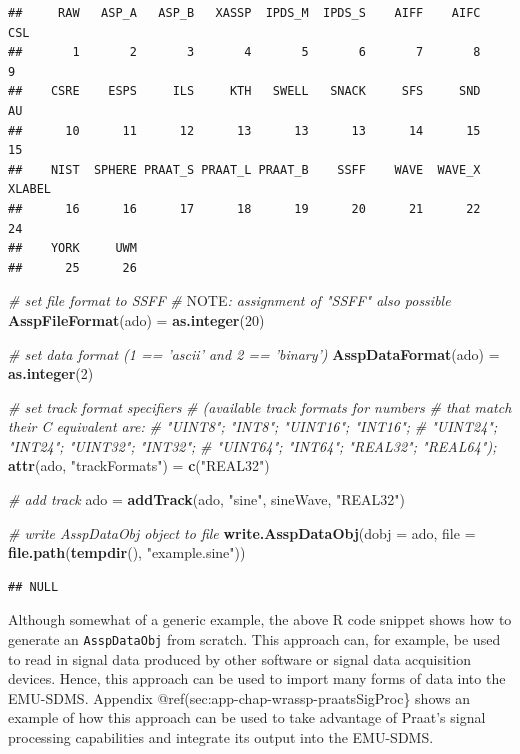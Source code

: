 \documentclass[]{book}
\newenvironment{Shaded}{\begin{snugshade}}{\end{snugshade}}
\newcommand{\AlertTok}[1]{\textcolor[rgb]{0.94,0.16,0.16}{#1}}
\newcommand{\CommentTok}[1]{\textcolor[rgb]{0.56,0.35,0.01}{\textit{#1}}}
\newcommand{\DataTypeTok}[1]{\textcolor[rgb]{0.13,0.29,0.53}{#1}}
\newcommand{\DecValTok}[1]{\textcolor[rgb]{0.00,0.00,0.81}{#1}}
\newcommand{\KeywordTok}[1]{\textcolor[rgb]{0.13,0.29,0.53}{\textbf{#1}}}
\newcommand{\NormalTok}[1]{#1}
\newcommand{\StringTok}[1]{\textcolor[rgb]{0.31,0.60,0.02}{#1}}
\theoremstyle{definition}
\theoremstyle{definition}
\theoremstyle{definition}
\theoremstyle{remark}
\begin{document}
\begin{verbatim}
##     RAW   ASP_A   ASP_B   XASSP  IPDS_M  IPDS_S    AIFF    AIFC     CSL 
##       1       2       3       4       5       6       7       8       9 
##    CSRE    ESPS     ILS     KTH   SWELL   SNACK     SFS     SND      AU 
##      10      11      12      13      13      13      14      15      15 
##    NIST  SPHERE PRAAT_S PRAAT_L PRAAT_B    SSFF    WAVE  WAVE_X  XLABEL 
##      16      16      17      18      19      20      21      22      24 
##    YORK     UWM 
##      25      26
\end{verbatim}

\begin{Shaded}
\begin{Highlighting}[]
\CommentTok{# set file format to SSFF}
\CommentTok{# }\AlertTok{NOTE}\CommentTok{: assignment of "SSFF" also possible}
\KeywordTok{AsspFileFormat}\NormalTok{(ado) =}\StringTok{ }\KeywordTok{as.integer}\NormalTok{(}\DecValTok{20}\NormalTok{)}

\CommentTok{# set data format (1 == 'ascii' and 2 == 'binary')}
\KeywordTok{AsspDataFormat}\NormalTok{(ado) =}\StringTok{ }\KeywordTok{as.integer}\NormalTok{(}\DecValTok{2}\NormalTok{)}

\CommentTok{# set track format specifiers}
\CommentTok{# (available track formats for numbers}
\CommentTok{# that match their C equivalent are:}
\CommentTok{# "UINT8"; "INT8"; "UINT16"; "INT16";}
\CommentTok{# "UINT24"; "INT24"; "UINT32"; "INT32";}
\CommentTok{# "UINT64"; "INT64"; "REAL32"; "REAL64");}
\KeywordTok{attr}\NormalTok{(ado, }\StringTok{"trackFormats"}\NormalTok{) =}\StringTok{ }\KeywordTok{c}\NormalTok{(}\StringTok{"REAL32"}\NormalTok{)}

\CommentTok{# add track}
\NormalTok{ado =}\StringTok{ }\KeywordTok{addTrack}\NormalTok{(ado, }\StringTok{"sine"}\NormalTok{, sineWave, }\StringTok{"REAL32"}\NormalTok{)}

\CommentTok{# write AsspDataObj object to file}
\KeywordTok{write.AsspDataObj}\NormalTok{(}\DataTypeTok{dobj =}\NormalTok{ ado,}
                  \DataTypeTok{file =} \KeywordTok{file.path}\NormalTok{(}\KeywordTok{tempdir}\NormalTok{(), }\StringTok{"example.sine"}\NormalTok{))}
\end{Highlighting}
\end{Shaded}

\begin{verbatim}
## NULL
\end{verbatim}

Although somewhat of a generic example, the above R code snippet shows
how to generate an \texttt{AsspDataObj} from scratch. This approach can,
for example, be used to read in signal data produced by other software
or signal data acquisition devices. Hence, this approach can be used to
import many forms of data into the EMU-SDMS. Appendix
@ref(sec:app-chap-wrassp-praatsSigProc\} shows an example of how this
approach can be used to take advantage of Praat's signal processing
capabilities and integrate its output into the EMU-SDMS.
\end{document}
